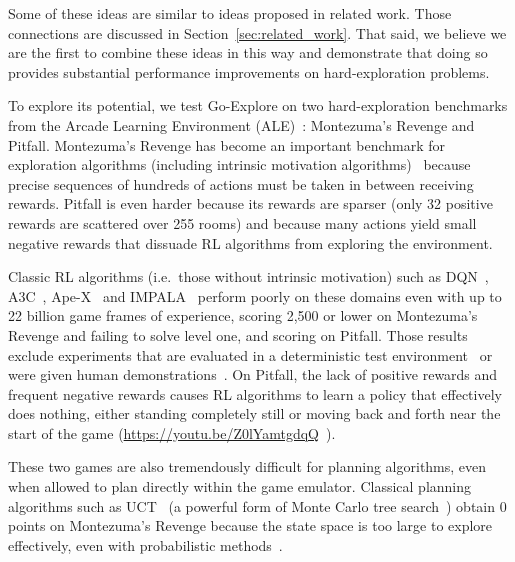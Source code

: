 \documentclass{article}
\begin{document}
Some of these ideas are similar to ideas proposed in related work.  Those connections are discussed in Section~\ref{sec:related_work}. That said, we believe we are the first to combine these ideas in this way and demonstrate that doing so provides substantial performance improvements on hard-exploration problems.
 
To explore its potential, we test Go-Explore on two hard-exploration benchmarks from the Arcade Learning Environment (ALE)~\cite{bellemare2013arcade,Machado2018RevisitingTA}: Montezuma's Revenge and Pitfall. Montezuma's Revenge has become an important  benchmark for exploration algorithms (including intrinsic motivation algorithms)~\cite{bellemare2016unifying,garriga2017solving,tang2017exploration,gruslys2017reactor,sasikumar2017exploration,ostrovski2017count,Stanton2018DeepCS,ODonoghue2018TheUB,burda:rnd2018,Choi2018ContingencyAwareEI} because precise sequences of hundreds of actions must be taken in between receiving rewards. 
Pitfall is even harder because its rewards are sparser (only 32 positive rewards are scattered over 255 rooms) and because many actions yield small negative rewards that dissuade RL algorithms from exploring the environment. 

Classic RL algorithms (i.e.\ those without intrinsic motivation) such as DQN~\cite{mnih:nature15}, A3C~\cite{a3c}, Ape-X~\cite{horgan:apexdqn2018} and IMPALA~\cite{espeholt:impala2018} perform poorly on these domains even with up to 22 billion game frames of experience, scoring 2,500 or lower on Montezuma's Revenge and failing to solve level one, and scoring  on Pitfall. Those results exclude experiments that are evaluated in a deterministic test environment~\cite{liu2019learning, Keramati2018FastEW} or were given human demonstrations~\cite{hester2017deep, pohlen2018observe, aytar2018playing}. On Pitfall, the lack of positive rewards and frequent negative rewards causes RL algorithms to learn a policy that effectively does nothing, either standing completely still or moving back and forth near the start of the game (\url{https://youtu.be/Z0lYamtgdqQ}~\cite{such2018atari}). 
 
These two games are also tremendously difficult for planning algorithms, even when allowed to plan directly within the game emulator. Classical planning algorithms such as UCT~\cite{Kocsis2006BanditBM,Kocsis2006ImprovedMS,Browne2012ASO} (a powerful form of Monte Carlo tree search~\cite{Browne2012ASO,Chaslot2008MonteCarloTS}) obtain 0 points on Montezuma's Revenge because the state space is too large to explore effectively, even with probabilistic methods~\cite{bellemare2013arcade,Lipovetzky2015ClassicalPW}. 
\end{document}
